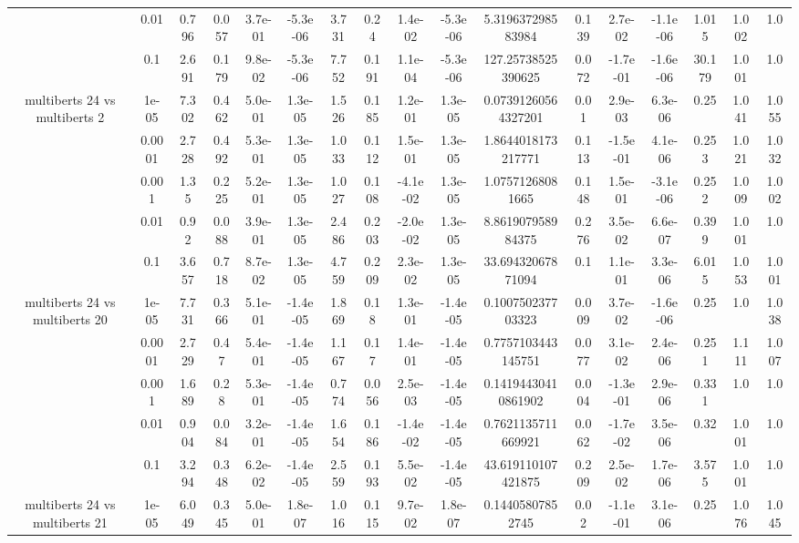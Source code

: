 \begin{tabular}{|c|c|c|c|c|c|c|c|c|c|c|c|c|c|c|c|c|}
 & 0.01 & 0.796 & 0.057 & 3.7e-01 & -5.3e-06 & 3.731 & 0.24 & 1.4e-02 & -5.3e-06 & 5.319637298583984 & 0.139 & 2.7e-02 & -1.1e-06 & 1.015 & 1.002 & 1.0 \\
 & 0.1 & 2.691 & 0.179 & 9.8e-02 & -5.3e-06 & 7.752 & 0.191 & 1.1e-04 & -5.3e-06 & 127.25738525390625 & 0.072 & -1.7e-01 & -1.6e-06 & 30.179 & 1.001 & 1.0 \\
\hline
\multirow{5}{*}{multiberts 24 vs multiberts 2} & 1e-05 & 7.302 & 0.462 & 5.0e-01 & 1.3e-05 & 1.526 & 0.185 & 1.2e-01 & 1.3e-05 & 0.07391260564327201 & 0.01 & 2.9e-03 & 6.3e-06 & 0.25 & 1.041 & 1.055 \\
 & 0.0001 & 2.728 & 0.492 & 5.3e-01 & 1.3e-05 & 1.033 & 0.112 & 1.5e-01 & 1.3e-05 & 1.8644018173217771 & 0.113 & -1.5e-01 & 4.1e-06 & 0.253 & 1.021 & 1.032 \\
 & 0.001 & 1.35 & 0.225 & 5.2e-01 & 1.3e-05 & 1.027 & 0.108 & -4.1e-02 & 1.3e-05 & 1.07571268081665 & 0.148 & 1.5e-01 & -3.1e-06 & 0.252 & 1.009 & 1.002 \\
 & 0.01 & 0.92 & 0.088 & 3.9e-01 & 1.3e-05 & 2.486 & 0.203 & -2.0e-02 & 1.3e-05 & 8.861907958984375 & 0.276 & 3.5e-02 & 6.6e-07 & 0.399 & 1.001 & 1.0 \\
 & 0.1 & 3.657 & 0.718 & 8.7e-02 & 1.3e-05 & 4.759 & 0.209 & 2.3e-02 & 1.3e-05 & 33.69432067871094 & 0.1 & 1.1e-01 & 3.3e-06 & 6.015 & 1.053 & 1.001 \\
\hline
\multirow{5}{*}{multiberts 24 vs multiberts 20} & 1e-05 & 7.731 & 0.366 & 5.1e-01 & -1.4e-05 & 1.869 & 0.18 & 1.3e-01 & -1.4e-05 & 0.100750237703323 & 0.009 & 3.7e-02 & -1.6e-06 & 0.25 & 1.0 & 1.038 \\
 & 0.0001 & 2.729 & 0.47 & 5.4e-01 & -1.4e-05 & 1.167 & 0.17 & 1.4e-01 & -1.4e-05 & 0.7757103443145751 & 0.077 & 3.1e-02 & 2.4e-06 & 0.251 & 1.111 & 1.007 \\
 & 0.001 & 1.689 & 0.28 & 5.3e-01 & -1.4e-05 & 0.774 & 0.056 & 2.5e-03 & -1.4e-05 & 0.14194430410861902 & 0.004 & -1.3e-01 & 2.9e-06 & 0.331 & 1.0 & 1.0 \\
 & 0.01 & 0.904 & 0.084 & 3.2e-01 & -1.4e-05 & 1.654 & 0.186 & -1.4e-02 & -1.4e-05 & 0.7621135711669921 & 0.062 & -1.7e-02 & 3.5e-06 & 0.32 & 1.001 & 1.0 \\
 & 0.1 & 3.294 & 0.348 & 6.2e-02 & -1.4e-05 & 2.559 & 0.193 & 5.5e-02 & -1.4e-05 & 43.619110107421875 & 0.209 & 2.5e-02 & 1.7e-06 & 3.575 & 1.001 & 1.0 \\
\hline
\multirow{5}{*}{multiberts 24 vs multiberts 21} & 1e-05 & 6.049 & 0.345 & 5.0e-01 & 1.8e-07 & 1.016 & 0.115 & 9.7e-02 & 1.8e-07 & 0.14405807852745 & 0.02 & -1.1e-01 & 3.1e-06 & 0.25 & 1.076 & 1.045 \\

\end{tabular}
